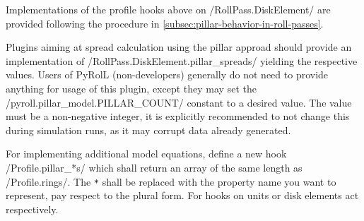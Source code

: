 \documentclass[11pt]{PyRollDocs}
\begin{document}
    Implementations of the profile hooks above on \py/RollPass.DiskElement/ are provided following the procedure in \autoref{subsec:pillar-behavior-in-roll-passes}.

    Plugins aiming at spread calculation using the pillar approad should provide an implementation of \py/RollPass.DiskElement.pillar_spreads/ yielding the respective values.
    Users of PyRolL (non-developers) generally do not need to provide anything for usage of this plugin, except they may set the \py/pyroll.pillar_model.PILLAR_COUNT/ constant to a desired value.
    The value must be a non-negative integer, it is explicitly recommended to not change this during simulation runs, as it may corrupt data already generated.

    For implementing additional model equations, define a new hook \py/Profile.pillar_*s/ which shall return an array of the same length as \py/Profile.rings/.
    The \texttt{*} shall be replaced with the property name you want to represent, pay respect to the plural form.
    For hooks on units or disk elements act respectively.

    \printbibliography
\end{document}
